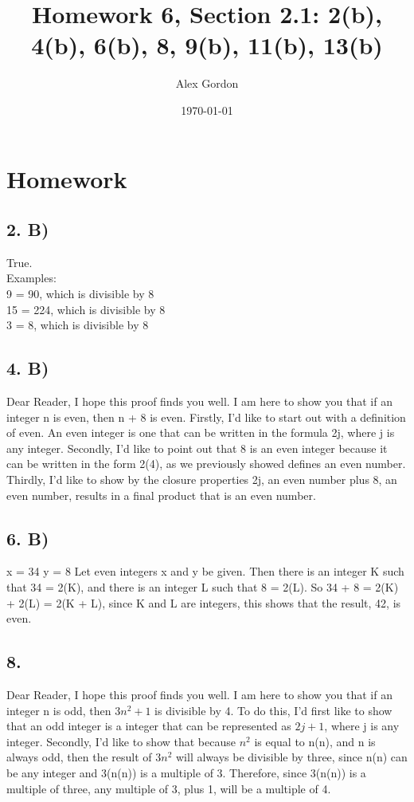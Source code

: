 \documentclass[12]{scrartcl}
\begin{document}
\title{Homework 6, Section 2.1: 2(b), 4(b), 6(b), 8, 9(b), 11(b), 13(b)}
\author{Alex Gordon}
\date{\today}
\maketitle
\section*{Homework}
\subsection*{2. B)}
True.\\
Examples: \\
9 = 90, which is divisible by 8\\
15 = 224, which is divisible by 8\\
3 = 8, which is divisible by 8
\subsection*{4. B)}
Dear Reader, I hope this proof finds you well. I am here to show you that if an integer n is even, then n + 8 is even. Firstly, I'd like to start out with a definition of even. An even integer is one that can be written in the formula 2j, where j is any integer. Secondly, I'd like to point out that 8 is an even integer because it can be written in the form 2(4), as we previously showed defines an even number. Thirdly, I'd like to show by the closure properties 2j, an even number plus 8, an even number, results in a final product that is an even number. 

\subsection*{6. B)}
x = 34
y = 8
Let even integers x and y be given. Then there is an integer K such that 34 = 2(K), and there is an integer L such that 8 = 2(L). So 34 + 8 = 2(K) + 2(L) = 2(K + L), since K and L are integers, this shows that the result, 42, is even. 
\subsection*{8.}
Dear Reader, I hope this proof finds you well. I am here to show you that if an integer n is odd, then $3n^2 + 1$ is divisible by 4. To do this, I'd first like to show that an odd integer is a integer that can be represented as $2j + 1$, where j is any integer. Secondly, I'd like to show that because $n^2$ is equal to n(n), and n is always odd, then the result of $3n^2$ will always be divisible by three, since n(n) can be any integer and 3(n(n)) is a multiple of 3. Therefore, since 3(n(n)) is a multiple of three, any multiple of 3, plus 1, will be a multiple of 4. 
\end{document}
